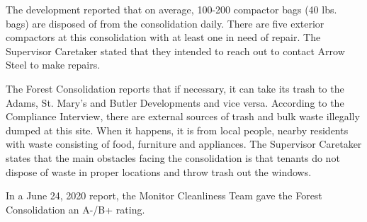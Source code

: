 The development reported that on average, 100-200 compactor bags (40 lbs. bags) are disposed of from the consolidation daily. There are five exterior compactors at this consolidation with at least one in need of repair. The Supervisor Caretaker stated that they intended to reach out to contact Arrow Steel to make repairs. 

The Forest Consolidation reports that if necessary, it can take its trash to the Adams, St. Mary's and Butler Developments and vice versa. According to the Compliance Interview, there are external sources of trash and bulk waste illegally dumped at this site. When it happens, it is from local people, nearby residents with waste consisting of food, furniture and appliances. The Supervisor Caretaker states that the main obstacles facing the consolidation is that tenants do not dispose of waste in proper locations and throw trash out the windows. 

In a June 24, 2020 report, the Monitor Cleanliness Team gave the Forest Consolidation an A-/B+ rating.